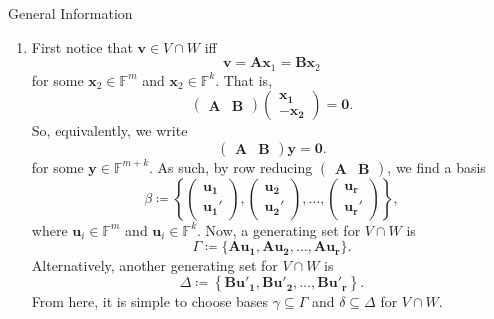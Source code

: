 \documentclass[../Notes.tex]{subfiles}
\begin{document}
\begin{stbox}{General Information}
\begin{itemize}
        \begin{enumerate}
            \item First notice that \(\mathbf{v} \in V\cap W\) iff
            \[\mathbf{v}=\mathbf{A}\mathbf{x}_1=\mathbf{B}\mathbf{x}_2\]
            for some \(\mathbf{x}_2\in \mathbb{F}^m\) and \(\mathbf{x}_2\in \mathbb{F}^k\). That is,
            \[\begin{pmatrix}
                \mathbf{A} & \mathbf{B} 
            \end{pmatrix}
            \begin{pmatrix}
                \mathbf{x_1}\\
                -\mathbf{x_2}
            \end{pmatrix}
            =\mathbf{0}.\]
            So, equivalently, we write
            \[\begin{pmatrix}
                \mathbf{A} & \mathbf{B} 
            \end{pmatrix}
            \mathbf{y}=\mathbf{0}.\]
            for some \(\mathbf{y}\in \mathbb{F}^{m+k}\). As such, by row reducing             
            \(\begin{pmatrix}
                \mathbf{A} & \mathbf{B} 
            \end{pmatrix}\), 
            we find a basis 
            \[\beta\coloneq\left\{
                \begin{pmatrix}
                    \mathbf{u_1}\\
                    \mathbf{u_1'}
                \end{pmatrix},
                \begin{pmatrix}
                    \mathbf{u_2}\\
                    \mathbf{u_2'}
                \end{pmatrix},\dots,
                \begin{pmatrix}
                    \mathbf{u_r}\\
                    \mathbf{u_r'}
                \end{pmatrix}
            \right\},\]
            where \(\mathbf{u}_i \in \mathbb{F}^m\) and \(\mathbf{u}_i \in \mathbb{F}^k\).
            Now, 
            a generating set for \(V\cap W\) is
            \[\Gamma\coloneq\{\mathbf{A}\mathbf{u_1},\mathbf{A}\mathbf{u_2},\dots,\mathbf{A}\mathbf{u_r}\}.\]
            Alternatively, 
            another generating set for \(V\cap W\) is
            \[\Delta\coloneq\left\{\mathbf{B}\mathbf{u'_1},\mathbf{B}\mathbf{u'_2},\dots,\mathbf{B}\mathbf{u'_r}\right\}.\]
            From here, it is simple to choose bases \(\gamma\subseteq\Gamma\) and \(\delta\subseteq\Delta\) for \(V\cap W\). 
            

\end{enumerate}
\end{itemize}
\end{stbox}
\end{document}
